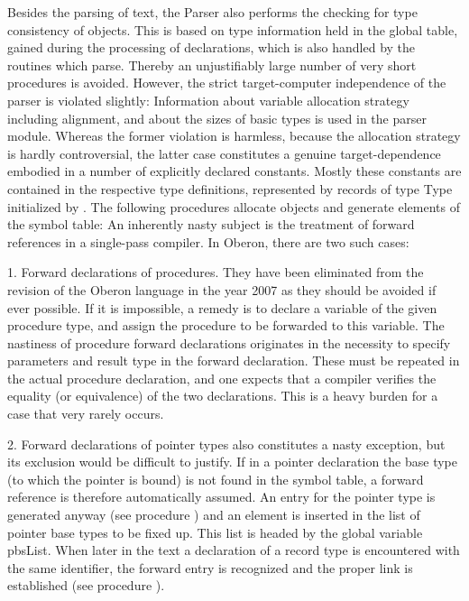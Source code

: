 Besides the parsing of text, the Parser also performs the checking for type consistency of objects. This is based on type information held in the global table, gained during the processing of declarations, which is also handled by the routines which parse. Thereby an unjustifiably large number of very short procedures is avoided. However, the strict target-computer independence of the parser is violated slightly: Information about variable allocation strategy including alignment, and about the sizes of basic types is used in the parser module. Whereas the former violation is harmless, because the allocation strategy is hardly controversial, the latter case constitutes a genuine target-dependence embodied in a number of explicitly declared constants. Mostly these constants are contained in the respective type definitions, represented by records of type Type initialized by . The following procedures allocate objects and generate elements of the symbol table:
\noindent An inherently nasty subject is the treatment of forward references in a single-pass compiler. In Oberon, there are two such cases:

\item{1.} Forward declarations of procedures. They have been eliminated from the revision of the Oberon language in the year 2007 as they should be avoided if ever possible. If it is impossible, a remedy is to declare a variable of the given procedure type, and assign the procedure to be forwarded to this variable. The nastiness of procedure forward declarations originates in the necessity to specify parameters and result type in the forward declaration. These must be repeated in the actual procedure declaration, and one expects that a compiler verifies the equality (or equivalence) of the two declarations. This is a heavy burden for a case that very rarely occurs.

\item{2.} Forward declarations of pointer types also constitutes a nasty exception, but its exclusion would be difficult to justify. If in a pointer declaration the base type (to which the pointer is bound) is not found in the symbol table, a forward reference is therefore automatically assumed. An entry for the pointer type is generated anyway (see procedure ) and an element is inserted in the list of pointer base types to be fixed up. This list is headed by the global variable pbsList. When later in the text a declaration of a record type is encountered with the same identifier, the forward entry is recognized and the proper link is established (see procedure ).

